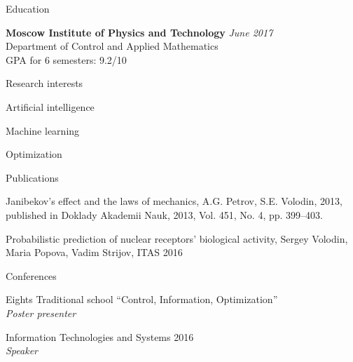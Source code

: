 \documentclass{resume} %
\begin{document}

\begin{rSection}{Education}

{\bf Moscow Institute of Physics and Technology} \hfill {\em June 2017} \\ 
Department of Control and Applied Mathematics\\
GPA for 6 semesters: 9.2/10

\end{rSection}


\begin{rSection}{Research interests}
	\item Artificial intelligence
	\item Machine learning
	\item Optimization

\end{rSection}


\begin{rSection}{Publications}
	\item Janibekov’s effect and the laws of mechanics, A.G. Petrov, S.E. Volodin, 2013, published in Doklady Akademii Nauk, 2013, Vol. 451, No. 4, pp. 399–403.
	
	\item Probabilistic prediction of nuclear receptors’ biological activity, Sergey Volodin, Maria Popova, Vadim Strijov, ITAS 2016
	
\end{rSection}

\begin{rSection}{Conferences}
\item Eights Traditional school “Control, Information, Optimization”\\
{\em Poster presenter}
\item Information Technologies and Systems 2016\\
{\em Speaker}
\end{rSection}
\end{document}
